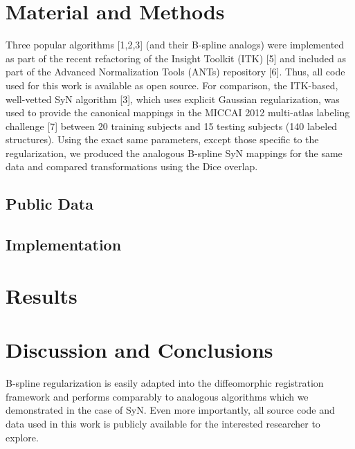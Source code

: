 \documentclass{frontiersSCNS}
\begin{document}
\section{Material and Methods}

Three popular algorithms [1,2,3] (and their B-spline analogs) were implemented as part of the recent refactoring of the Insight Toolkit (ITK) [5] and included as part of the Advanced Normalization Tools (ANTs) repository [6].  Thus, all code used for this work is available as open source.   For comparison, the ITK-based, well-vetted SyN algorithm [3], which uses explicit Gaussian regularization, was used to provide the canonical mappings in the MICCAI 2012 multi-atlas labeling challenge [7] between 20 training subjects and 15 testing subjects (140 labeled structures).  Using the exact same parameters, except those specific to the regularization, we produced the analogous B-spline SyN mappings for the same data and compared transformations using the Dice overlap.

\subsection{Public Data}

\subsection{Implementation}

\section{Results}


\section{Discussion and Conclusions}

B-spline regularization is easily adapted into the diffeomorphic registration framework and performs comparably to analogous algorithms which we demonstrated in the case of SyN.  Even more importantly, all source code and data used in this work is publicly available for the interested researcher to explore.
\end{document}
